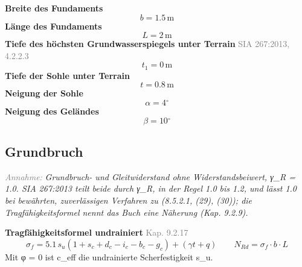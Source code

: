 \documentclass[11pt,a4paper]{article}
\newcommand{\normref}[1]{{\small\textcolor{gray}{#1}}}
\newcommand{\hinweis}[2]{\par\noindent\textcolor{gray}{\textit{#1:}} \textit{#2}\par}
\begin{document}
\noindent\textbf{Breite des Fundaments}
\begin{equation*}
b = 1.5\,\mathrm{m}
\end{equation*}
\noindent\textbf{Länge des Fundaments}
\begin{equation*}
L = 2\,\mathrm{m}
\end{equation*}
\noindent\textbf{Tiefe des höchsten Grundwasserspiegels unter Terrain} \hfill \normref{SIA 267:2013, 4.2.2.3}
\begin{equation*}
t_1 = 0\,\mathrm{m}
\end{equation*}
\noindent\textbf{Tiefe der Sohle unter Terrain}
\begin{equation*}
t = 0.8\,\mathrm{m}
\end{equation*}
\noindent\textbf{Neigung der Sohle}
\begin{equation*}
\alpha = 4{}^{\circ}
\end{equation*}
\noindent\textbf{Neigung des Geländes}
\begin{equation*}
\beta = 10{}^{\circ}
\end{equation*}
\subsection{Grundbruch}
\hinweis{Annahme}{Grundbruch- und Gleitwiderstand ohne Widerstandsbeiwert, γ\_R = 1.0. SIA 267:2013 teilt beide durch γ\_R, in der Regel 1.0 bis 1.2, und lässt 1.0 bei bewährten, zuverlässigen Verfahren zu (8.5.2.1, (29), (30)); die Tragfähigkeitsformel nennt das Buch eine Näherung (Kap. 9.2.9).}
\noindent\textbf{Tragfähigkeitsformel undrainiert} \hfill \normref{Kap. 9.2.17}
\begin{equation*}
\sigma_f = 5.1 \, s_u \left(1 + s_c + d_c - i_c - b_c - g_c\right) + \left(\gamma t + q\right) \qquad N_{Rd} = \sigma_f \cdot b \cdot L
\end{equation*}
Mit φ = 0 ist c\_eff die undrainierte Scherfestigkeit s\_u.
\end{document}
